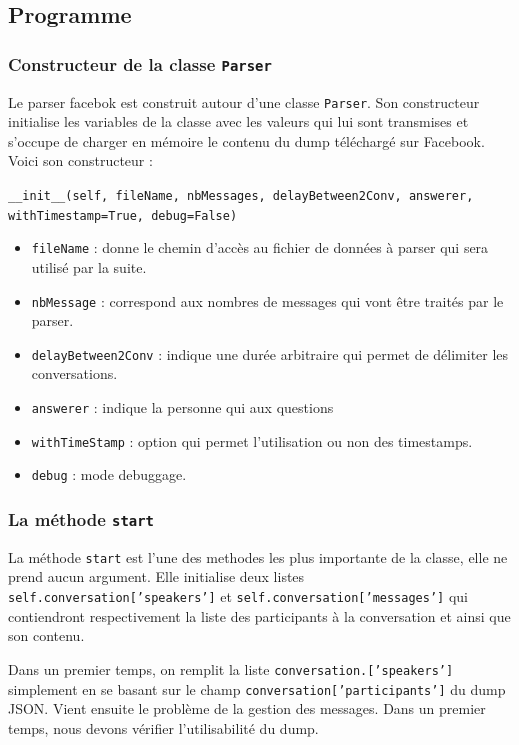 \documentclass[10pt,a4paper]{article}
\begin{document}
\subsection{Programme}
\subsubsection{Constructeur de la classe \texttt{Parser}}
Le parser facebok est construit autour d'une classe \texttt{Parser}. Son constructeur initialise les variables de la classe avec les valeurs qui lui sont transmises et s'occupe de charger en mémoire le contenu du dump téléchargé sur Facebook.  Voici son constructeur :
\begin{center}
	\texttt{\_\_init\_\_(self, fileName, nbMessages, delayBetween2Conv, answerer, withTimestamp=True, debug=False)}
\end{center}


\begin{itemize}
  \item \texttt{fileName} : donne le chemin d'accès au fichier de données à parser qui sera utilisé par la suite.
  \item \texttt{nbMessage} : correspond aux nombres de messages qui vont être traités par le parser.
  \item \texttt{delayBetween2Conv} : indique une durée arbitraire qui permet de délimiter les conversations.
  \item \texttt{answerer} : indique la personne qui aux questions
  \item \texttt{withTimeStamp} : option qui permet l'utilisation ou non des timestamps.
  \item \texttt{debug} : mode debuggage.
\end{itemize}

\subsubsection{La méthode \texttt{start}}
La méthode \texttt{start} est l'une des methodes les plus importante de la classe, elle ne prend aucun argument. Elle initialise deux listes \texttt{self.conversation['speakers']} et \texttt{self.conversation['messages']} qui contiendront respectivement la liste des participants à la conversation et ainsi que son contenu.

Dans un premier temps, on remplit la liste \texttt{conversation.['speakers']} simplement en se basant sur le champ \texttt{conversation['participants']} du dump JSON. Vient ensuite le problème de la gestion des messages. Dans un premier temps, nous devons vérifier l'utilisabilité du dump.
\end{document}
